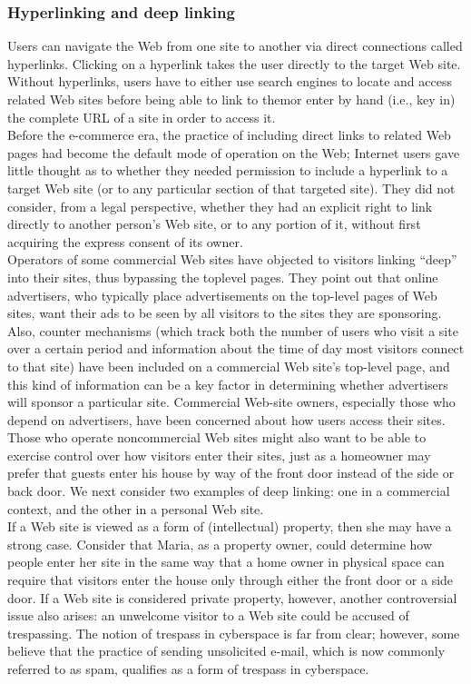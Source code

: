 \documentclass[12pt]{article}
\theoremstyle{definition}
\begin{document}
\subsubsection{Hyperlinking and deep linking}
Users can navigate the Web from one site to another via direct connections called
hyperlinks. Clicking on a hyperlink takes the user directly to the target Web site. Without
hyperlinks, users have to either use search engines to locate and access related Web sites before being able to link to themor enter by hand (i.e., key in) the complete URL of a site
in order to access it.\\
Before the e-commerce era, the practice of including direct links to related Web
pages had become the default mode of operation on the Web; Internet users gave little
thought as to whether they needed permission to include a hyperlink to a target Web site
(or to any particular section of that targeted site). They did not consider, from a legal
perspective, whether they had an explicit right to link directly to another person’s Web
site, or to any portion of it, without first acquiring the express consent of its owner.\\
Operators of some commercial
Web sites have objected to visitors linking “deep” into their sites, thus bypassing the toplevel
pages. They point out that online advertisers, who typically place advertisements on
the top-level pages of Web sites, want their ads to be seen by all visitors to the sites they
are sponsoring.\\
Also, counter mechanisms (which track both the number of users who visit a site over
a certain period and information about the time of day most visitors connect to that site)
have been included on a commercial Web site’s top-level page, and this kind of
information can be a key factor in determining whether advertisers will sponsor a
particular site. Commercial Web-site owners, especially those who depend on advertisers,
have been concerned about how users access their sites.\\
Those who operate noncommercial Web sites might also want to be able to exercise
control over how visitors enter their sites, just as a homeowner may prefer that guests
enter his house by way of the front door instead of the side or back door. We next
consider two examples of deep linking: one in a commercial context, and the other in a
personal Web site.\\
If a Web site is viewed as a form of (intellectual)
property, then she may have a strong case. Consider that Maria, as a property owner,
could determine how people enter her site in the same way that a home owner in physical
space can require that visitors enter the house only through either the front door or a side
door. If a Web site is considered private property, however, another controversial issue
also arises: an unwelcome visitor to a Web site could be accused of trespassing. The
notion of trespass in cyberspace is far from clear; however, some believe that the practice
of sending unsolicited e-mail, which is now commonly referred to as spam, qualifies as a
form of trespass in cyberspace.
\end{document}

